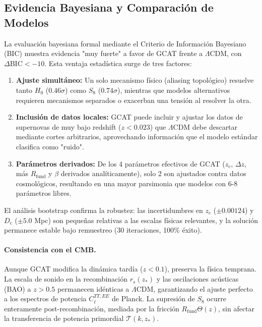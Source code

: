\documentclass[12pt, a4paper]{article}
\theoremstyle{plain}
\theoremstyle{definition}
\begin{document}
\subsection{Evidencia Bayesiana y Comparación de Modelos}

La evaluación bayesiana formal mediante el Criterio de Información Bayesiano (BIC) muestra evidencia "muy fuerte" a favor de GCAT frente a $\Lambda$CDM, con $\Delta\text{BIC} < -10$. Esta ventaja estadística surge de tres factores:

\begin{enumerate}
    \item \textbf{Ajuste simultáneo:} Un solo mecanismo físico (aliasing topológico) resuelve tanto $H_0$ ($0.46\sigma$) como $S_8$ ($0.74\sigma$), mientras que modelos alternativos requieren mecanismos separados o exacerban una tensión al resolver la otra.
    
    \item \textbf{Inclusión de datos locales:} GCAT puede incluir y ajustar los datos de supernovas de muy bajo redshift ($z < 0.023$) que $\Lambda$CDM debe descartar mediante cortes arbitrarios, aprovechando información que el modelo estándar clasifica como "ruido".
    
    \item \textbf{Parámetros derivados:} De los 4 parámetros efectivos de GCAT ($z_c$, $\Delta z$, más $R_{\text{fund}}$ y $\beta$ derivados analíticamente), solo 2 son ajustados contra datos cosmológicos, resultando en una mayor parsimonia que modelos con 6-8 parámetros libres.
\end{enumerate}

El análisis bootstrap confirma la robustez: las incertidumbres en $z_c$ ($\pm 0.00124$) y $D_c$ ($\pm 5.0$ Mpc) son pequeñas relativas a las escalas físicas relevantes, y la solución permanece estable bajo remuestreo (30 iteraciones, 100\% éxito).

\paragraph{Consistencia con el CMB.} 
Aunque GCAT modifica la dinámica tardía ($z < 0.1$), preserva la física 
temprana. La escala de sonido en la recombinación $r_s(z_*)$ y las 
oscilaciones acústicas (BAO) a $z > 0.5$ permanecen idénticas a $\Lambda$CDM, 
garantizando el ajuste perfecto a los espectros de potencia $C_\ell^{TT,EE}$ 
de Planck. La supresión de $S_8$ ocurre enteramente post-recombinación, 
mediada por la fricción $R_{\text{fund}}\Theta(z)$, sin afectar la 
transferencia de potencia primordial $\mathcal{T}(k,z_*)$.
\end{document}
